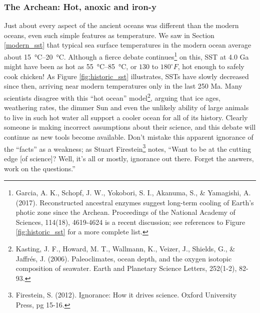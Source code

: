 \documentclass[amstex,12pt]{book}
\begin{document}
{\subsubsection{The Archean: Hot, anoxic and iron-y}
Just about every aspect of the ancient oceans was different than the modern oceans, even such simple features as temperature. We saw in Section \ref{modern_sst} that typical sea surface temperatures in the modern ocean average about \SIrange{15}{20}{\celsius}. Although a fierce debate continues\footnote{Garcia, A. K., Schopf, J. W., Yokobori, S. I., Akanuma, S., \& Yamagishi, A. (2017). Reconstructed ancestral enzymes suggest long-term cooling of Earth’s photic zone since the Archean. Proceedings of the National Academy of Sciences, 114(18), 4619-4624 is a recent discussion; see references to Figure \ref{fig:historic_sst} for a more complete list.} on this, SST at 4.0 Ga might have been as hot as \SIrange{55}{85}{\celsius}, or $130$ to $180^\circ F$, hot enough to safely cook chicken! As Figure \ref{fig:historic_sst} illustrates, SSTs have slowly decreased since then, arriving near modern temperatures only in the last 250 Ma. Many scientists disagree with this ``hot ocean'' model\footnote{Kasting, J. F., Howard, M. T., Wallmann, K., Veizer, J., Shields, G., \& Jaffr\'es, J. (2006). Paleoclimates, ocean depth, and the oxygen isotopic composition of seawater. Earth and Planetary Science Letters, 252(1-2), 82-93.}, arguing that ice ages, weathering rates, the dimmer Sun and even the unlikely ability of large animals to live in such hot water all support a cooler ocean for all of its history. Clearly someone is making incorrect assumptions about their science, and this debate will continue as new tools become available. Don't mistake this apparent ignorance of the ``facts'' as a weakness; as Stuart Firestein\footnote{Firestein, S. (2012). Ignorance: How it drives science. Oxford University Press, pg 15-16.} notes, ``Want to be at the cutting edge [of science]? Well, it's all or mostly, ignorance out there. Forget the answers, work on the questions.''\\
}
\end{document}
